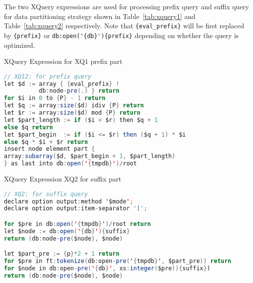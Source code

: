 The two XQuery expressions are used for processing prefix query
and suffix query for data partitioning strategy shown in Table~\ref{tab:xquery1}
and Table~\ref{tab:xquery2} respectively.
Note that \verb|{eval_prefix}| will be first replaced by \verb|{prefix}| or
\verb|db:open('{db}'){prefix}| depending on whether the query is optimized.

\begin{table}
\centering
\label{tab:xquery1}
\caption{XQuery Expression for XQ1 prefix part}
  \footnotesize
\begin{lstlisting}[language=java,frame=single]
// XQ12: for prefix query
let $d := array { {eval_prefix} !
          db:node-pre(.) } return
for $i in 0 to {P} - 1 return
let $q := array:size($d) idiv {P} return
let $r := array:size($d) mod {P} return
let $part_length := if ($i < $r) then $q + 1
else $q return
let $part_begin  := if ($i <= $r) then ($q + 1) * $i
else $q * $i + $r return
insert node element part {
array:subarray($d, $part_begin + 1, $part_length)
} as last into db:open('{tmpdb}')/root
\end{lstlisting}
\end{table}


\begin{table}
	\centering
	\label{tab:xquery2}
	\caption{XQuery Expression XQ2 for suffix part}

  \footnotesize
\begin{lstlisting}[language=java,frame=single]
// XQ2: for suffix query
declare option output:method '$mode';
declare option output:item-separator '[';

for $pre in db:open('{tmpdb}')/root return
let $node := db:open('{db}'){suffix}
return (db:node-pre($node), $node)

let $part_pre := {p}*2 + 1 return
for $pre in ft:tokenize(db:open-pre('{tmpdb}', $part_pre)) return
for $node in db:open-pre('{db}', xs:integer($pre)){suffix})
return (db:node-pre($node), $node)
\end{lstlisting}
\end{table}


